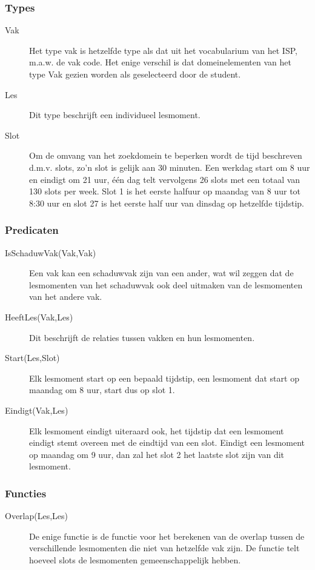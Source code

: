 \subsubsection{Types}
\begin{description}
\item[Vak] Het type vak is hetzelfde type als dat uit het vocabularium van het ISP, m.a.w. de vak code. Het enige verschil is dat domeinelementen van het type Vak gezien worden als geselecteerd door de student. 
\item[Les] Dit type beschrijft een individueel lesmoment.
\item[Slot] Om de omvang van het zoekdomein te beperken wordt de tijd beschreven d.m.v. slots, zo'n slot is gelijk aan 30 minuten. Een werkdag start om 8 uur en eindigt om 21 uur, \'{e}\'{e}n dag telt vervolgens 26 slots met een totaal van 130 slots per week. Slot 1 is het eerste halfuur op maandag van 8 uur tot 8:30 uur en slot 27 is het eerste half uur van dinsdag op hetzelfde tijdstip.
\end{description}

\subsubsection{Predicaten}
\begin{description}
\item[IsSchaduwVak(Vak,Vak)] Een vak kan een schaduwvak zijn van een ander, wat wil zeggen dat de lesmomenten van het schaduwvak ook deel uitmaken van de lesmomenten van het andere vak.
\item[HeeftLes(Vak,Les)] Dit beschrijft de relaties tussen vakken en hun lesmomenten.
\item[Start(Les,Slot)] Elk lesmoment start op een bepaald tijdstip, een lesmoment dat start op maandag om 8 uur, start dus op slot 1. 
\item[Eindigt(Vak,Les)] Elk lesmoment eindigt uiteraard ook, het tijdstip dat een lesmoment eindigt stemt overeen met de eindtijd van een slot. Eindigt een lesmoment op maandag om 9 uur, dan zal het slot 2 het laatste slot zijn van dit lesmoment.
\end{description}

\subsubsection{Functies}
\begin{description}
\item[Overlap(Les,Les)] De enige functie is de functie voor het berekenen van de overlap tussen de verschillende lesmomenten die niet van hetzelfde vak zijn. De functie telt hoeveel slots de lesmomenten gemeenschappelijk hebben.
\end{description}

